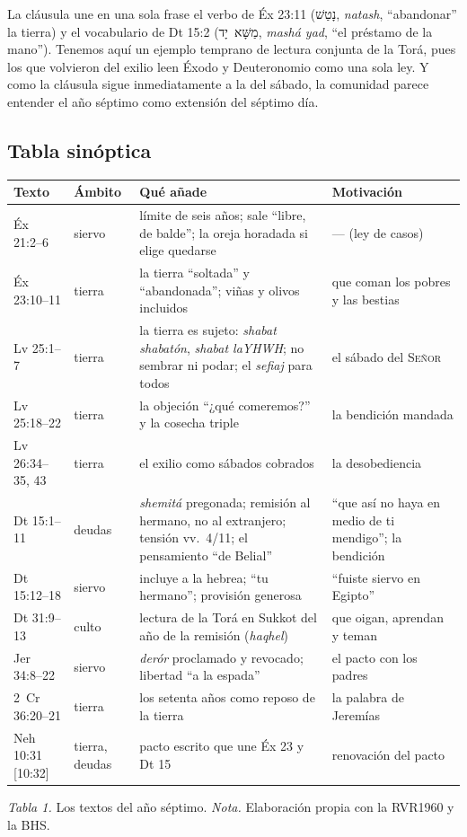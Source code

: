 \documentclass[11pt,letterpaper]{article}
\newcommand{\heb}[1]{\mbox{\foreignlanguage{hebrew}{#1}}}
\newcommand{\SENOR}{\textsc{Señor}}
\begin{document}
La cláusula une en una sola frase el verbo de Éx 23:11 (\heb{נָטַשׁ}, \emph{natash}, ``abandonar'' la tierra) y el vocabulario de Dt 15:2 (\heb{מַשָּׁא יָד}, \emph{mashá yad}, ``el préstamo de la mano''). Tenemos aquí un ejemplo temprano de lectura conjunta de la Torá, pues los que volvieron del exilio leen Éxodo y Deuteronomio como una sola ley. Y como la cláusula sigue inmediatamente a la del sábado, la comunidad parece entender el año séptimo como extensión del séptimo día.

\subsection{Tabla sinóptica}

\begin{center}\footnotesize\renewcommand{\arraystretch}{1.12}
\begin{tabular}{@{}L{2.3cm}L{1.9cm}L{6.2cm}L{3.9cm}@{}}
\toprule
\textbf{Texto} & \textbf{Ámbito} & \textbf{Qué añade} & \textbf{Motivación} \\ \midrule
Éx 21:2--6 & siervo & límite de seis años; sale ``libre, de balde''; la oreja horadada si elige quedarse & --- (ley de casos) \\
Éx 23:10--11 & tierra & la tierra ``soltada'' y ``abandonada''; viñas y olivos incluidos & que coman los pobres y las bestias \\
Lv 25:1--7 & tierra & la tierra es sujeto: \emph{shabat shabatón}, \emph{shabat laYHWH}; no sembrar ni podar; el \emph{sefiaj} para todos & el sábado del \SENOR{} \\
Lv 25:18--22 & tierra & la objeción ``¿qué comeremos?'' y la cosecha triple & la bendición mandada \\
Lv 26:34--35, 43 & tierra & el exilio como sábados cobrados & la desobediencia \\
Dt 15:1--11 & deudas & \emph{shemitá} pregonada; remisión al hermano, no al extranjero; tensión vv.~4/11; el pensamiento ``de Belial'' & ``que así no haya en medio de ti mendigo''; la bendición \\
Dt 15:12--18 & siervo & incluye a la hebrea; ``tu hermano''; provisión generosa & ``fuiste siervo en Egipto'' \\
Dt 31:9--13 & culto & lectura de la Torá en Sukkot del año de la remisión (\emph{haqhel}) & que oigan, aprendan y teman \\
Jer 34:8--22 & siervo & \emph{derór} proclamado y revocado; libertad ``a la espada'' & el pacto con los padres \\
2~Cr 36:20--21 & tierra & los setenta años como reposo de la tierra & la palabra de Jeremías \\
Neh 10:31 [10:32] & tierra, deudas & pacto escrito que une Éx 23 y Dt 15 & renovación del pacto \\
\bottomrule
\end{tabular}\par
{\footnotesize\color{sepia}\textit{Tabla 1.} Los textos del año séptimo. \textit{Nota.} Elaboración propia con la RVR1960 y la BHS.}
\end{center}
\end{document}
